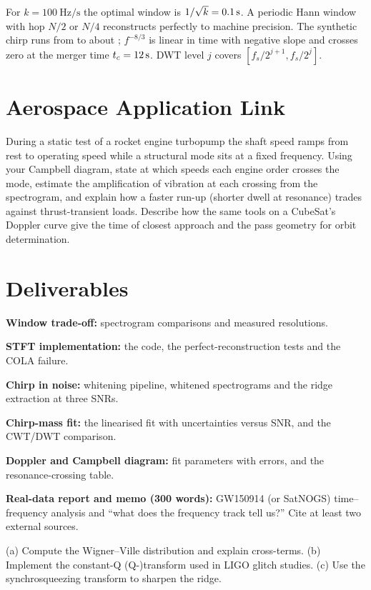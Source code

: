 \documentclass[11pt,a4paper]{article}
\begin{document}
\begin{checkpoint}
For $k=\SI{100}{\hertz\per\second}$ the optimal window is $1/\sqrt k=\SI{0.1}{\second}$. A periodic Hann window with hop $N/2$ or $N/4$ reconstructs perfectly to machine precision. The synthetic chirp runs from  to about ; $f^{-8/3}$ is linear in time with negative slope and crosses zero at the merger time $t_c=\SI{12}{\second}$. DWT level $j$ covers $[f_s/2^{j+1},f_s/2^j]$.
\end{checkpoint}

\section*{Aerospace Application Link}
During a static test of a rocket engine turbopump the shaft speed ramps from rest to operating speed while a structural mode sits at a fixed frequency. Using your Campbell diagram, state at which speeds each engine order crosses the mode, estimate the amplification of vibration at each crossing from the spectrogram, and explain how a faster run-up (shorter dwell at resonance) trades against thrust-transient loads. Describe how the same tools on a CubeSat's Doppler curve give the time of closest approach and the pass geometry for orbit determination.

\section*{Deliverables}
\begin{delivs}
  \item[D1] \textbf{Window trade-off:} spectrogram comparisons and measured resolutions.
  \item[D2] \textbf{STFT implementation:} the code, the perfect-reconstruction tests and the COLA failure.
  \item[D3] \textbf{Chirp in noise:} whitening pipeline, whitened spectrograms and the ridge extraction at three SNRs.
  \item[D4] \textbf{Chirp-mass fit:} the linearised fit with uncertainties versus SNR, and the CWT/DWT comparison.
  \item[D5] \textbf{Doppler and Campbell diagram:} fit parameters with errors, and the resonance-crossing table.
  \item[D6] \textbf{Real-data report and memo (300 words):} GW150914 (or SatNOGS) time--frequency analysis and ``what does the frequency track tell us?'' Cite at least two external sources.
  \item[Bonus] (a) Compute the Wigner--Ville distribution and explain cross-terms. (b) Implement the constant-Q (Q-)transform used in LIGO glitch studies. (c) Use the synchrosqueezing transform to sharpen the ridge.
\end{delivs}
\end{document}
